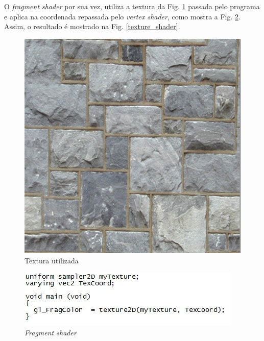 \begin{description}
	O \textit{fragment shader} por sua vez, utiliza a textura da  Fig. \ref{tex} passada pelo programa e aplica na coordenada repassada pelo  \textit{vertex shader}, como mostra a  Fig. \ref{texture_fs}. Assim, o resultado é mostrado na  Fig. \ref{texture_shader}.

	\begin{figure}[h]
	\centering
		\includegraphics[keepaspectratio=true,scale=0.5]{figuras/tex.jpg}
	\caption{Textura utilizada}
	\label{tex}
	\end{figure}

	\begin{figure}[h]
	\centering
		\includegraphics[keepaspectratio=true,scale=1.0]{figuras/texture_fs.jpg}
	\caption{\textit{Fragment shader}}
	\label{texture_fs}
	\end{figure}


\end{description}
